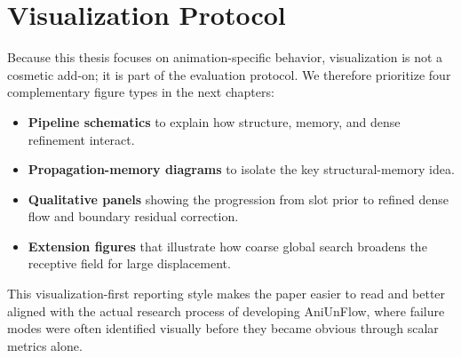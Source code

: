 \section{Visualization Protocol}

Because this thesis focuses on animation-specific behavior, visualization is not a cosmetic add-on; it is part of the evaluation protocol. We therefore prioritize four complementary figure types in the next chapters:
\begin{itemize}
\item \textbf{Pipeline schematics} to explain how structure, memory, and dense refinement interact.
\item \textbf{Propagation-memory diagrams} to isolate the key structural-memory idea.
\item \textbf{Qualitative panels} showing the progression from slot prior to refined dense flow and boundary residual correction.
\item \textbf{Extension figures} that illustrate how coarse global search broadens the receptive field for large displacement.
\end{itemize}

This visualization-first reporting style makes the paper easier to read and better aligned with the actual research process of developing AniUnFlow, where failure modes were often identified visually before they became obvious through scalar metrics alone.
